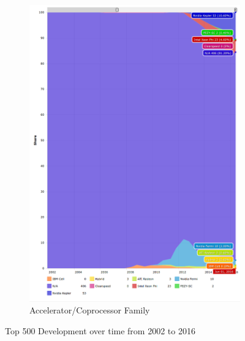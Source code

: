 \begin{figure}
\begin{subfigure}{.5\textwidth}
  \includegraphics[width=1\linewidth]{images/top500-coprocessor.png}
  \caption{Accelerator/Coprocessor Family}
  \label{fig:sub2}
\end{subfigure}
\caption{Top 500 Development over time from 2002 to 2016 \cite{www-top500}}
\label{F:top500}
\end{figure}

